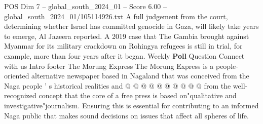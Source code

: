 \begin{textsample}{POS Dim 7 – global\_south\_2024\_01 – Score 6.00 – global\_south\_2024\_01/105114926.txt}
A full judgement from the court, determining whether Israel has committed genocide in Gaza, will likely take years to emerge, Al Jazeera reported.
A 2019 case that The Gambia brought against Myanmar for its military crackdown on Rohingya refugees is still in trial, for example, more than four years after it began.
Weekly \textbf{Poll} Question Connect with us Intro footer The Morung Express The Morung Express is a people-oriented alternative newspaper based in Nagaland that was conceived from the Naga people ' s historical realities and @ @ @ @ @ @ @ @ @ @ from the well-recognized concept that the core of a free press is based on"qualitative and investigative"journalism.
Ensuring this is essential for contributing to an informed Naga public that makes sound decisions on issues that affect all spheres of life.

\end{textsample}
